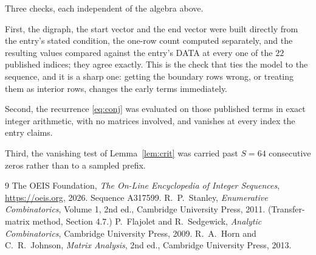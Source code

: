 \documentclass[11pt,a4paper]{article}
\theoremstyle{plain}
\theoremstyle{definition}
\begin{document}
Three checks, each independent of the algebra above.

First, the digraph, the start vector and the end vector were built directly from the
entry's stated condition, the one-row count computed separately, and the resulting values
compared against the entry's DATA at every one of the $22$ published indices; they
agree exactly. This is the check that ties the model to the sequence, and it is a sharp one:
getting the boundary rows wrong, or treating them as interior rows, changes the early terms
immediately.

Second, the recurrence \eqref{eq:conj} was evaluated on those published terms in exact
integer arithmetic, with no matrices involved, and vanishes at every index the entry claims.

Third, the vanishing test of Lemma~\ref{lem:crit} was carried past $S=64$ consecutive
zeros rather than to a sampled prefix.

\begin{thebibliography}{9}
 The OEIS Foundation, \emph{The On-Line Encyclopedia of Integer
Sequences}, \url{https://oeis.org}, 2026. Sequence A317599.
 R.~P.~Stanley, \emph{Enumerative Combinatorics}, Volume 1, 2nd ed.,
Cambridge University Press, 2011. (Transfer-matrix method, Section 4.7.)
 P.~Flajolet and R.~Sedgewick, \emph{Analytic Combinatorics}, Cambridge
University Press, 2009.
 R.~A.~Horn and C.~R.~Johnson, \emph{Matrix Analysis}, 2nd ed., Cambridge
University Press, 2013.
\end{thebibliography}
\end{document}
